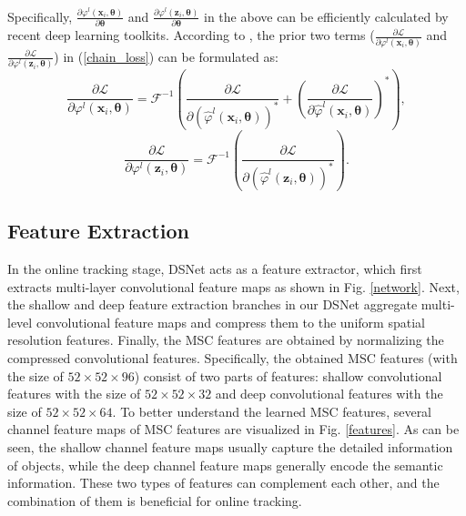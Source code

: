\documentclass[runningheads]{llncs}
\begin{document}
Specifically, $\frac{\partial \varphi^{l}(\mathbf{x}_{i}, \mathbf{\theta})}{\partial \mathbf{\theta}}$ and $\frac{\partial \varphi^{l}(\mathbf{z}_{i}, \mathbf{\theta})}{\partial \mathbf{\theta}}$ in the above can be efficiently calculated by recent deep learning toolkits.
According to \cite{CFNet,DCFNet}, the prior two terms ($\frac{\partial \mathcal{L}}{\partial \varphi^{l}(\mathbf{x}_{i}, \mathbf{\theta})}$ and $\frac{\partial \mathcal{L}}{\partial \varphi^{l}(\mathbf{z}_{i}, \mathbf{\theta})}$) in (\ref{chain_loss}) can be formulated as:
\begin{equation}\label{loss_solve_}
  \frac{\partial \mathcal{L}}{\partial \varphi^{l}(\mathbf{x}_{i}, \mathbf{\theta})} = \mathcal{F}^{-1}(\frac{\partial \mathcal{L}}{\partial (\hat{\varphi}^{l}(\mathbf{x}_{i}, \mathbf{\theta}))^{\ast}}+ (\frac{\partial \mathcal{L}}{\partial \hat{\varphi}^{l}(\mathbf{x}_{i}, \mathbf{\theta})})^{\ast}),
\end{equation}
\begin{equation}\label{loss_solve}
  \frac{\partial \mathcal{L}}{\partial \varphi^{l}(\mathbf{z}_{i}, \mathbf{\theta})} = \mathcal{F}^{-1}(\frac{\partial \mathcal{L}}{\partial (\hat{\varphi}^{l}(\mathbf{z}_{i}, \mathbf{\theta}))^{\ast}}).
\end{equation}




\subsection{Feature Extraction}
In the online tracking stage, DSNet acts as a feature extractor, which first extracts multi-layer convolutional feature maps as shown in Fig. \ref{network}. Next, the shallow and deep feature extraction branches in our DSNet aggregate multi-level convolutional feature maps and compress them to the uniform spatial resolution features. Finally, the MSC features are obtained by normalizing the compressed convolutional features.  Specifically, the obtained MSC features (with the size of $52\times52\times96$) consist of two parts of features: shallow convolutional features with the size of $52\times52\times32$ and deep convolutional features with the size of $52\times52\times64$. To better understand the learned MSC features, several channel feature maps of MSC features are visualized in Fig. \ref{features}. As can be seen, the shallow channel feature maps usually capture the detailed information of objects, while the deep channel feature maps generally encode the semantic information. These two types of features can complement each other, and the combination of them is beneficial for online tracking.
\end{document}
